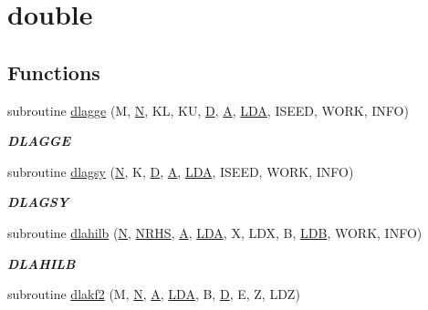\hypertarget{group__double__matgen}{}\section{double}
\label{group__double__matgen}
\subsection*{Functions}
\begin{DoxyCompactItemize}
\item 
subroutine \hyperlink{group__double__matgen_ga304ff4a7c0dde761985bac5659ea48eb}{dlagge} (M, \hyperlink{polmisc_8c_a0240ac851181b84ac374872dc5434ee4}{N}, K\+L, K\+U, \hyperlink{odrpack_8h_a7dae6ea403d00f3687f24a874e67d139}{D}, \hyperlink{classA}{A}, \hyperlink{example__user_8c_ae946da542ce0db94dced19b2ecefd1aa}{L\+D\+A}, I\+S\+E\+E\+D, W\+O\+R\+K, I\+N\+F\+O)
\begin{DoxyCompactList}\small\item\em {\bfseries D\+L\+A\+G\+G\+E} \end{DoxyCompactList}\item 
subroutine \hyperlink{group__double__matgen_ga5f743c86cc2e595aef8e6f8662562026}{dlagsy} (\hyperlink{polmisc_8c_a0240ac851181b84ac374872dc5434ee4}{N}, K, \hyperlink{odrpack_8h_a7dae6ea403d00f3687f24a874e67d139}{D}, \hyperlink{classA}{A}, \hyperlink{example__user_8c_ae946da542ce0db94dced19b2ecefd1aa}{L\+D\+A}, I\+S\+E\+E\+D, W\+O\+R\+K, I\+N\+F\+O)
\begin{DoxyCompactList}\small\item\em {\bfseries D\+L\+A\+G\+S\+Y} \end{DoxyCompactList}\item 
subroutine \hyperlink{group__double__matgen_gacd60e0db880c818055c7990ca42261d5}{dlahilb} (\hyperlink{polmisc_8c_a0240ac851181b84ac374872dc5434ee4}{N}, \hyperlink{example__user_8c_aa0138da002ce2a90360df2f521eb3198}{N\+R\+H\+S}, \hyperlink{classA}{A}, \hyperlink{example__user_8c_ae946da542ce0db94dced19b2ecefd1aa}{L\+D\+A}, X, L\+D\+X, B, \hyperlink{example__user_8c_a50e90a7104df172b5a89a06c47fcca04}{L\+D\+B}, W\+O\+R\+K, I\+N\+F\+O)
\begin{DoxyCompactList}\small\item\em {\bfseries D\+L\+A\+H\+I\+L\+B} \end{DoxyCompactList}\item 
subroutine \hyperlink{group__double__matgen_ga248f9b3d04b58e381d7d6e4fb30b5a77}{dlakf2} (M, \hyperlink{polmisc_8c_a0240ac851181b84ac374872dc5434ee4}{N}, \hyperlink{classA}{A}, \hyperlink{example__user_8c_ae946da542ce0db94dced19b2ecefd1aa}{L\+D\+A}, B, \hyperlink{odrpack_8h_a7dae6ea403d00f3687f24a874e67d139}{D}, E, Z, L\+D\+Z)

\end{DoxyCompactItemize}
